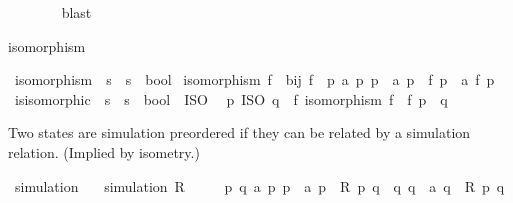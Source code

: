 \begin{isabellebody}
\ \ \ \ \ \ \isamarkupfalse%
\ blast\isanewline
\ \ \isamarkupfalse%
\isanewline
{}\isamarkupfalse%
%
\endisatagproof
{\isafoldproof}%
%
\isadelimproof
%
\endisadelimproof
%
\begin{isamarkuptext}%
isomorphism%
\end{isamarkuptext}\isamarkuptrue%
\isamarkupfalse%
\ isomorphism\ {\isacharcolon}{\kern0pt}{\isacharcolon}{\kern0pt}\ {\isacartoucheopen}{\isacharparenleft}{\kern0pt}{\isacharprime}{\kern0pt}s\ {\isasymRightarrow}\ {\isacharprime}{\kern0pt}s{\isacharparenright}{\kern0pt}\ {\isasymRightarrow}\ bool{\isacartoucheclose}\ \isanewline
{\isacartoucheopen}isomorphism\ f\ {\isasymequiv}\ bij\ f\ {\isasymand}\ {\isacharparenleft}{\kern0pt}{\isasymforall}p\ a\ p{\isacharprime}{\kern0pt}{\isachardot}{\kern0pt}\ p\ {\isasymmapsto}\ a\ p{\isacharprime}{\kern0pt}\ {\isasymlongleftrightarrow}\ f\ p\ {\isasymmapsto}\ a\ {\isacharparenleft}{\kern0pt}f\ p{\isacharprime}{\kern0pt}{\isacharparenright}{\kern0pt}{\isacharparenright}{\kern0pt}{\isacartoucheclose}\isanewline
\isanewline
{}\isamarkupfalse%
\ is{\isacharunderscore}{\kern0pt}isomorphic\ {\isacharcolon}{\kern0pt}{\isacharcolon}{\kern0pt}\ {\isacartoucheopen}{\isacharprime}{\kern0pt}s\ {\isasymRightarrow}\ {\isacharprime}{\kern0pt}s\ {\isasymRightarrow}\ bool{\isacartoucheclose}\ {\isacharparenleft}{\kern0pt}\ {\isacartoucheopen}{\isasymsimeq}ISO{\isacartoucheclose}\ {}{}{\isacharparenright}{\kern0pt}\ \isanewline
{\isacartoucheopen}p\ {\isasymsimeq}ISO\ q\ {\isasymequiv}\ {\isasymexists}f{\isachardot}{\kern0pt}\ isomorphism\ f\ {\isasymand}\ {\isacharparenleft}{\kern0pt}f\ p{\isacharparenright}{\kern0pt}\ {\isacharequal}{\kern0pt}\ q{\isacartoucheclose}%
\begin{isamarkuptext}%
Two states are simulation preordered if they can be related by
  a simulation relation. (Implied by isometry.)%
\end{isamarkuptext}\isamarkuptrue%
\isamarkupfalse%
\ simulation\isanewline
\ \ \ {\isacartoucheopen}simulation\ R\ {\isasymequiv}\isanewline
\ \ \ \ {\isasymforall}p\ q\ a\ p{\isacharprime}{\kern0pt}{\isachardot}{\kern0pt}\ p\ {\isasymmapsto}\ a\ p{\isacharprime}{\kern0pt}\ {\isasymand}\ R\ p\ q\ {\isasymlongrightarrow}\ {\isacharparenleft}{\kern0pt}{\isasymexists}q{\isacharprime}{\kern0pt}{\isachardot}{\kern0pt}\ q\ {\isasymmapsto}\ a\ q{\isacharprime}{\kern0pt}\ {\isasymand}\ R\ p{\isacharprime}{\kern0pt}\ q{\isacharprime}{\kern0pt}{\isacharparenright}{\kern0pt}{\isacartoucheclose}\isanewline

\end{isabellebody}
